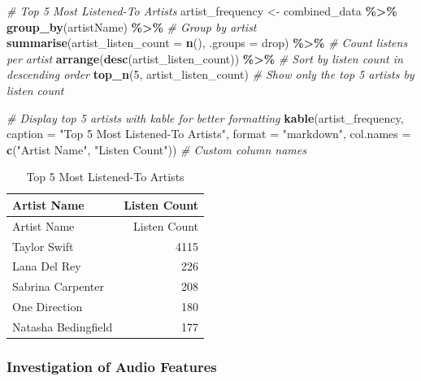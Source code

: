 \documentclass[
]{article}
\newenvironment{Shaded}{\begin{snugshade}}{\end{snugshade}}
\newcommand{\AttributeTok}[1]{\textcolor[rgb]{0.13,0.29,0.53}{#1}}
\newcommand{\CommentTok}[1]{\textcolor[rgb]{0.56,0.35,0.01}{\textit{#1}}}
\newcommand{\DecValTok}[1]{\textcolor[rgb]{0.00,0.00,0.81}{#1}}
\newcommand{\FunctionTok}[1]{\textcolor[rgb]{0.13,0.29,0.53}{\textbf{#1}}}
\newcommand{\NormalTok}[1]{#1}
\newcommand{\OtherTok}[1]{\textcolor[rgb]{0.56,0.35,0.01}{#1}}
\newcommand{\SpecialCharTok}[1]{\textcolor[rgb]{0.81,0.36,0.00}{\textbf{#1}}}
\newcommand{\StringTok}[1]{\textcolor[rgb]{0.31,0.60,0.02}{#1}}
\begin{document}
\begin{Shaded}
\begin{Highlighting}[]
\CommentTok{\# Top 5 Most Listened{-}To Artists}
\NormalTok{artist\_frequency }\OtherTok{\textless{}{-}}\NormalTok{ combined\_data }\SpecialCharTok{\%\textgreater{}\%}
  \FunctionTok{group\_by}\NormalTok{(artistName) }\SpecialCharTok{\%\textgreater{}\%}  \CommentTok{\# Group by artist}
  \FunctionTok{summarise}\NormalTok{(}\AttributeTok{artist\_listen\_count =} \FunctionTok{n}\NormalTok{(), }\AttributeTok{.groups =} \StringTok{\textquotesingle{}drop\textquotesingle{}}\NormalTok{) }\SpecialCharTok{\%\textgreater{}\%}  \CommentTok{\# Count listens per artist}
  \FunctionTok{arrange}\NormalTok{(}\FunctionTok{desc}\NormalTok{(artist\_listen\_count)) }\SpecialCharTok{\%\textgreater{}\%}  \CommentTok{\# Sort by listen count in descending order}
  \FunctionTok{top\_n}\NormalTok{(}\DecValTok{5}\NormalTok{, artist\_listen\_count)  }\CommentTok{\# Show only the top 5 artists by listen count}

\CommentTok{\# Display top 5 artists with kable for better formatting}
\FunctionTok{kable}\NormalTok{(artist\_frequency, }\AttributeTok{caption =} \StringTok{"Top 5 Most Listened{-}To Artists"}\NormalTok{, }\AttributeTok{format =} \StringTok{"markdown"}\NormalTok{, }
      \AttributeTok{col.names =} \FunctionTok{c}\NormalTok{(}\StringTok{"Artist Name"}\NormalTok{, }\StringTok{"Listen Count"}\NormalTok{))  }\CommentTok{\# Custom column names}
\end{Highlighting}
\end{Shaded}

\begin{longtable}[]{@{}lr@{}}
\caption{Top 5 Most Listened-To Artists}\tabularnewline
\toprule\noalign{}
Artist Name & Listen Count \\
\midrule\noalign{}
\endfirsthead
\toprule\noalign{}
Artist Name & Listen Count \\
\midrule\noalign{}
\endhead
\bottomrule\noalign{}
\endlastfoot
Taylor Swift & 4115 \\
Lana Del Rey & 226 \\
Sabrina Carpenter & 208 \\
One Direction & 180 \\
Natasha Bedingfield & 177 \\
\end{longtable}

\subsubsection{Investigation of Audio
Features}\label{investigation-of-audio-features}
\end{document}
